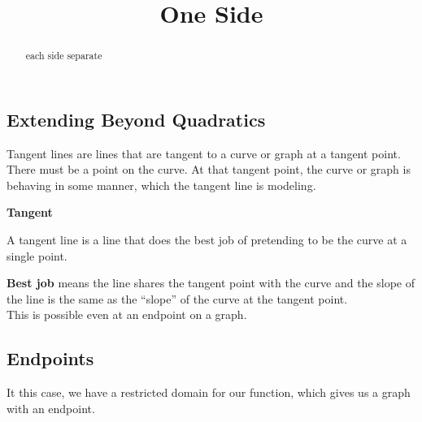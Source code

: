 \documentclass{ximera}
\title{One Side}
\begin{document}
\begin{abstract}
each side separate
\end{abstract}
\maketitle



\subsection*{Extending Beyond Quadratics} 


 
 

Tangent lines are lines that are tangent to a curve or graph at a tangent point. There must be a point on the curve. At that tangent point, the curve or graph is behaving in some manner, which the tangent line is modeling.  \\

\begin{idea} \textbf{\textcolor{blue!55!black}{Tangent}}

A tangent line is a line that does the best job of pretending to be the curve at a single point.
\end{idea}
\textbf{Best job} means the line shares the tangent point with the curve and the slope of the line is the same as the ``slope'' of the curve at the tangent point. \\





This is possible even at an endpoint on a graph.





\subsection*{Endpoints}



It this case, we have a restricted domain for our function, which gives us a graph with an endpoint. \\
\end{document}
